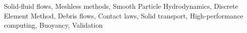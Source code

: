 \begin{keywords}
Solid-fluid flows, Meshless methods, Smooth Particle Hydrodynamics, Discrete Element Method, Debris flows, Contact laws, Solid transport, High-performance computing, Buoyancy, Validation
\end{keywords}
\clearpage
\thispagestyle{empty}
\cleardoublepage